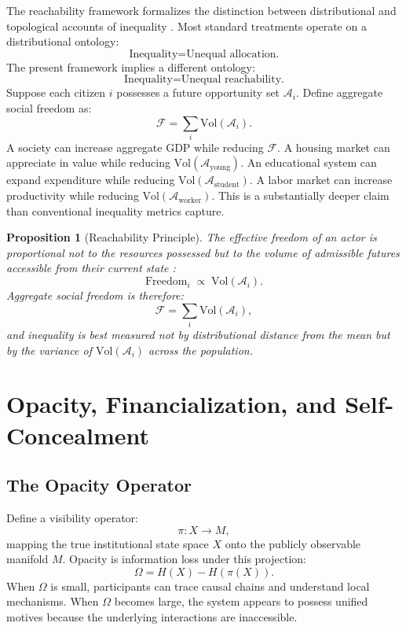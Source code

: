 \documentclass[12pt, a4paper]{article}
\theoremstyle{named}
\newtheorem{proposition}{Proposition}
\begin{document}
The reachability framework formalizes the distinction between
distributional and topological accounts of inequality
\cite{piketty2014,granovetter1985}. Most standard treatments operate
on a distributional ontology:
\[
  \text{Inequality} = \text{Unequal allocation.}
\]
The present framework implies a different ontology:
\[
  \text{Inequality} = \text{Unequal reachability.}
\]
Suppose each citizen $i$ possesses a future opportunity set
$\mathcal{A}_i$. Define aggregate social freedom as:
\[
  \mathcal{F} = \sum_i \mathrm{Vol}(\mathcal{A}_i).
\]
A society can increase aggregate GDP while reducing $\mathcal{F}$.
A housing market can appreciate in value while reducing
$\mathrm{Vol}(\mathcal{A}_{\text{young}})$. An educational system can
expand expenditure while reducing
$\mathrm{Vol}(\mathcal{A}_{\text{student}})$. A labor market can
increase productivity while reducing
$\mathrm{Vol}(\mathcal{A}_{\text{worker}})$. This is a substantially
deeper claim than conventional inequality metrics capture.

\begin{proposition}[Reachability Principle]
The effective freedom of an actor is proportional not to the resources
possessed but to the volume of admissible futures accessible from their
current state \cite{sen1999}:
\[
  \text{Freedom}_i \;\propto\; \mathrm{Vol}(\mathcal{A}_i).
\]
Aggregate social freedom is therefore:
\[
  \mathcal{F} = \sum_i \mathrm{Vol}(\mathcal{A}_i),
\]
and inequality is best measured not by distributional distance from the
mean but by the variance of $\mathrm{Vol}(\mathcal{A}_i)$ across the
population.
\end{proposition}

\section{Opacity, Financialization, and Self-Concealment}

\subsection{The Opacity Operator}

Define a visibility operator:
\[
  \pi: X \to M,
\]
mapping the true institutional state space $X$ onto the publicly
observable manifold $M$. Opacity is information loss under this
projection:
\[
  \Omega = H(X) - H(\pi(X)).
\]
When $\Omega$ is small, participants can trace causal chains and
understand local mechanisms. When $\Omega$ becomes large, the system
appears to possess unified motives because the underlying interactions
are inaccessible.
\end{document}
